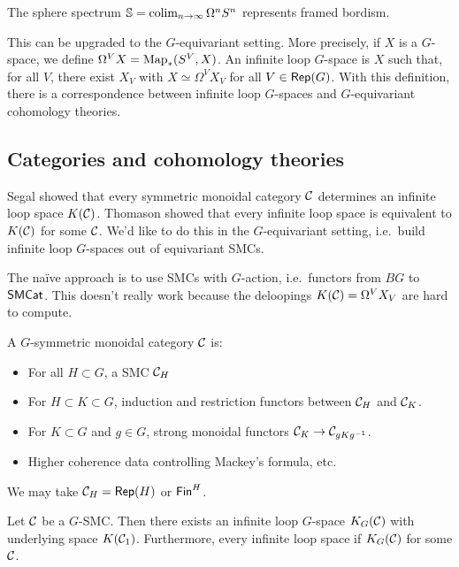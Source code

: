 \documentclass{amsart}
\begin{document}
\begin{ex}
  The sphere spectrum $\mathbb{S} = \operatorname*{colim}_{n \to \infty} \Omega^n S^n$ represents framed bordism.
\end{ex}

This can be upgraded to the $G$-equivariant setting.
More precisely, if $X$ is a $G$-space, we define $\Omega^V X = \operatorname{Map}_*(S^V, X)$.
An infinite loop $G$-space is $X$ such that, for all $V$, there exist $X_V$ with $X \simeq \Omega^V X_V$ for all $V \in \operatorname{\mathsf{Rep}}(G)$.
With this definition, there is a correspondence between infinite loop $G$-spaces and $G$-equivariant cohomology theories.

\subsection{Categories and cohomology theories}

Segal showed that every symmetric monoidal category $\mathcal{C}$ determines an infinite loop space $K(\mathcal{C})$.
Thomason showed that every infinite loop space is equivalent to $K(\mathcal{C})$ for some $\mathcal{C}$.
We'd like to do this in the $G$-equivariant setting, i.e.\ build infinite loop $G$-spaces out of equivariant SMCs.

The na\"ive approach is to use SMCs with $G$-action, i.e.\ functors from $BG$ to $\mathsf{SMCat}$.
This doesn't really work because the deloopings $K(\mathcal{C}) = \Omega^V X_V$ are hard to compute.

\begin{dfn}
  A $G$-symmetric monoidal category $\mathcal{C}$ is:
  \begin{itemize}
    \item For all $H \subset G$, a SMC $\mathcal{C}_H$
    \item For $H \subset K \subset G$, induction and restriction functors between $\mathcal{C}_H$ and $\mathcal{C}_K$.
    \item For $K \subset G$ and $g \in G$, strong monoidal functors $\mathcal{C}_K \to \mathcal{C}_{gKg^{-1}}$.
    \item Higher coherence data controlling Mackey's formula, etc.
  \end{itemize}
\end{dfn}

\begin{ex}
  We may take $\mathcal{C}_H = \operatorname{\mathsf{Rep}}(H)$ or $\mathsf{Fin}^H$.
\end{ex}

\begin{thm}
  Let $\mathcal{C}$ be a $G$-SMC.
  Then there exists an infinite loop $G$-space $K_G(\mathcal{C})$ with underlying space $K(\mathcal{C}_1)$.
  Furthermore, every infinite loop space if $K_G(\mathcal{C})$ for some $\mathcal{C}$.
\end{thm}
\end{document}

